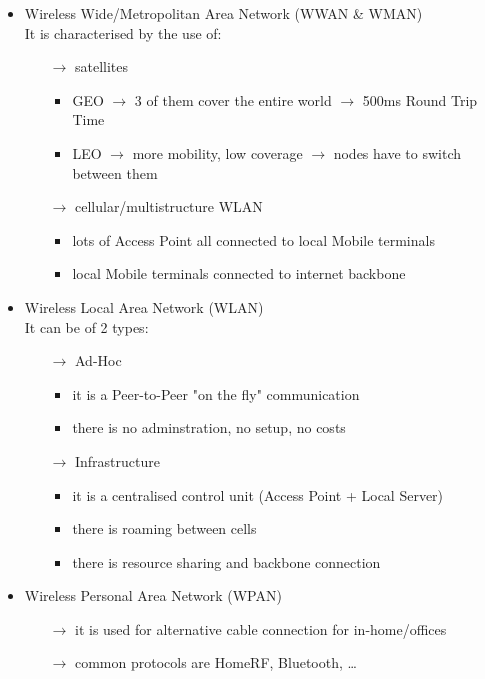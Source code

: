 \begin{itemize}
    \item Wireless Wide/Metropolitan Area Network (WWAN \& WMAN)\\
    It is characterised by the use of:
    \begin{itemize}
        \item[$\rightarrow$] satellites
        \begin{itemize}
            \item GEO $\rightarrow$ 3 of them cover the entire world $\rightarrow$ 500ms Round Trip Time
            \item LEO $\rightarrow$ more mobility, low coverage $\rightarrow$ nodes have to switch\\between them
        \end{itemize}
        \item[$\rightarrow$] cellular/multistructure WLAN
        \begin{itemize}
            \item lots of Access Point all connected to local Mobile terminals
            \item local Mobile terminals connected to internet backbone
        \end{itemize}
    \end{itemize}
    \newpage
    \item Wireless Local Area Network (WLAN)\\[0.2cm]
    It can be of 2 types:
    \begin{itemize}
        \item[$\rightarrow$] Ad-Hoc
        \begin{itemize}
            \item it is a Peer-to-Peer "on the fly" communication
            \item there is no adminstration, no setup, no costs
        \end{itemize}
        \item[$\rightarrow$] Infrastructure
        \begin{itemize}
            \item it is a centralised control unit (Access Point + Local Server)
            \item there is roaming between cells
            \item there is resource sharing and backbone connection
        \end{itemize}
    \end{itemize}
    \item Wireless Personal Area Network (WPAN)
    \begin{itemize}
        \item[$\rightarrow$] it is used for alternative cable connection for in-home/offices
        \item[$\rightarrow$] common protocols are HomeRF, Bluetooth, \dots
    \end{itemize}
\end{itemize}
